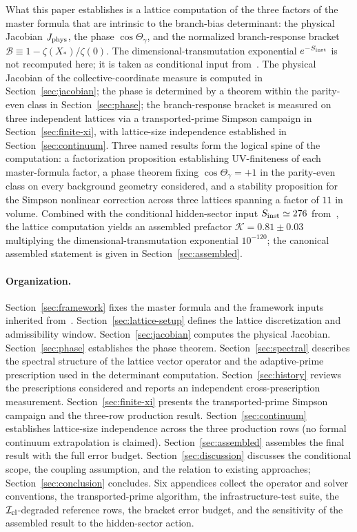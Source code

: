 \documentclass[a4paper,11pt]{article}
\theoremstyle{definition}
\newcommand{\Icl}{\mathcal{I}_{\rm cl}}
\newcommand{\Jphys}{J_{\rm phys}}
\newcommand{\Bobs}{\mathcal{B}}
\begin{document}
What this paper establishes is a lattice computation of the three
factors of the master formula that are intrinsic to the
branch-bias determinant: the physical Jacobian $\Jphys$, the
phase $\cos\Theta_\gamma$, and the normalized branch-response
bracket $\Bobs \equiv 1 - \zeta(X_*)/\zeta(0)$. The
dimensional-transmutation exponential $e^{-S_{\rm inst}}$ is not
recomputed here; it is taken as conditional input
from~\cite{companion-structural}. The physical Jacobian of the
collective-coordinate measure is computed in
Section~\ref{sec:jacobian}; the phase is determined by a theorem
within the parity-even class in Section~\ref{sec:phase}; the
branch-response bracket is measured on three independent lattices
via a transported-prime Simpson campaign in
Section~\ref{sec:finite-xi}, with lattice-size independence
established in Section~\ref{sec:continuum}. Three named results
form the logical spine of the computation: a factorization
proposition establishing UV-finiteness of each master-formula
factor, a phase theorem fixing $\cos\Theta_\gamma = +1$ in the
parity-even class on every background geometry considered, and a
stability proposition for the Simpson nonlinear correction across
three lattices spanning a factor of $11$ in volume. Combined with
the conditional hidden-sector input $S_{\rm inst} \simeq 276$
from~\cite{companion-structural}, the lattice computation yields
an assembled prefactor $\mathcal{K} = 0.81 \pm 0.03$ multiplying
the dimensional-transmutation exponential $10^{-120}$; the
canonical assembled statement is given in
Section~\ref{sec:assembled}.

\paragraph{Organization.}
Section~\ref{sec:framework} fixes the master formula and the
framework inputs inherited from~\cite{companion-structural}.
Section~\ref{sec:lattice-setup} defines the lattice
discretization and admissibility window.
Section~\ref{sec:jacobian} computes the physical Jacobian.
Section~\ref{sec:phase} establishes the phase theorem.
Section~\ref{sec:spectral} describes the spectral structure of
the lattice vector operator and the adaptive-prime prescription
used in the determinant computation. Section~\ref{sec:history}
reviews the prescriptions considered and reports an independent
cross-prescription measurement. Section~\ref{sec:finite-xi}
presents the transported-prime Simpson campaign and the
three-row production result. Section~\ref{sec:continuum} establishes lattice-size independence
across the three production rows (no formal continuum extrapolation is claimed). Section~\ref{sec:assembled} assembles the final result
with the full error budget. Section~\ref{sec:discussion}
discusses the conditional scope, the coupling assumption, and
the relation to existing approaches; Section~\ref{sec:conclusion}
concludes. Six appendices collect the operator and solver
conventions, the transported-prime algorithm, the
infrastructure-test suite, the $\Icl$-degraded reference rows,
the bracket error budget, and the sensitivity of the assembled
result to the hidden-sector action.
\end{document}
